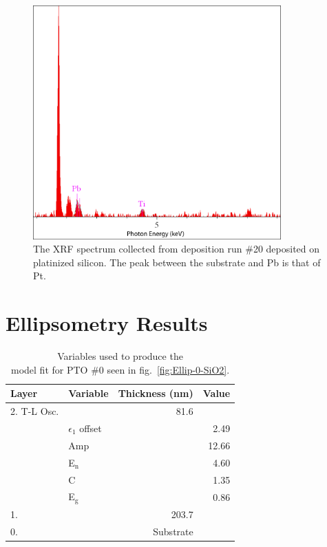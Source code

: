 \begin{figure}[htbp]
	\centering
	\includegraphics[width=0.85\textwidth]{./Figures/Appendix/Composition/PTO-run20-pt.png}
	\caption[XRF Spectrum of PTO \#20 on Pt-Si]%
		     {The XRF spectrum collected from deposition run \#20 deposited on platinized silicon. The peak between the substrate and Pb is that of Pt. }
	\label{fig:XRF-20-Pt}
\end{figure}

\clearpage

\section{Ellipsometry Results}
\label{sup:Ellipsometry}

\begin{table}[htbp]
	\centering
	\caption[PTO \#0 Ellipsometric Model Variables]{Variables used to produce the\\model fit for PTO \#0 seen in fig.~\vref{fig:Ellip-0-SiO2}. \label{tbl:PTO-0-ellip-variables}}
	\begin{tabular}{l l r r}
	\toprule
	Layer&Variable&Thickness (nm)&Value\\
	\midrule
	2. T-L Osc.&&81.6&\\
	&$\epsilon_{1}$ offset&&2.49\\
	&Amp&&12.66\\
	&E$_{\mathrm{n}}$&&4.60\\
	&C&&1.35\\
	&E$_{\mathrm{g}}$&&0.86\\
	1. \ce{SiO2}&&203.7&\\
	0. \ce{Si}&&Substrate&\\
	\bottomrule
	\end{tabular}
\end{table}

